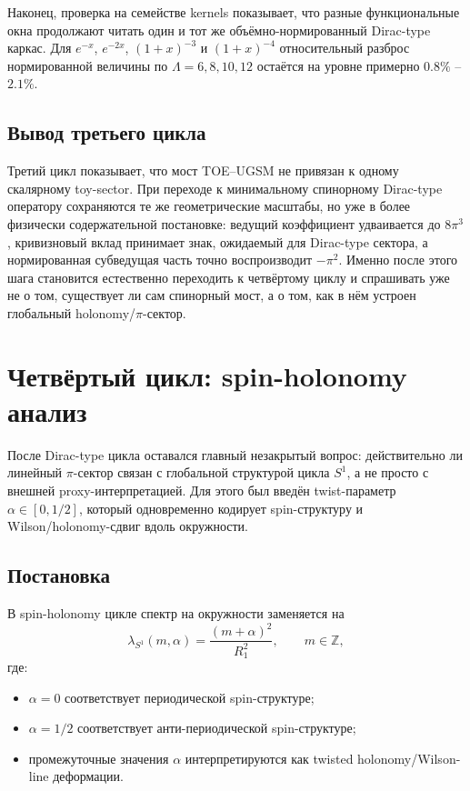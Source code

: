 \documentclass[12pt,a4paper]{article}
\begin{document}
Наконец, проверка на семействе kernels показывает, что разные функциональные окна продолжают читать один и тот же объёмно-нормированный Dirac-type каркас. Для \(e^{-x}\), \(e^{-2x}\), \((1+x)^{-3}\) и \((1+x)^{-4}\) относительный разброс нормированной величины по \(\Lambda=6,8,10,12\) остаётся на уровне примерно \(0.8\%\) -- \(2.1\%\).

\subsection{Вывод третьего цикла}

Третий цикл показывает, что мост TOE--UGSM не привязан к одному скалярному toy-sector. При переходе к минимальному спинорному Dirac-type оператору сохраняются те же геометрические масштабы, но уже в более физически содержательной постановке: ведущий коэффициент удваивается до \(8\pi^3\), кривизновый вклад принимает знак, ожидаемый для Dirac-type сектора, а нормированная субведущая часть точно воспроизводит \(-\pi^2\). Именно после этого шага становится естественно переходить к четвёртому циклу и спрашивать уже не о том, существует ли сам спинорный мост, а о том, как в нём устроен глобальный holonomy/\(\pi\)-сектор.


\section{Четвёртый цикл: spin-holonomy анализ}

После Dirac-type цикла оставался главный незакрытый вопрос: действительно ли линейный \(\pi\)-сектор связан с глобальной структурой цикла \(S^1\), а не просто с внешней proxy-интерпретацией. Для этого был введён twist-параметр \(\alpha\in[0,1/2]\), который одновременно кодирует spin-структуру и Wilson/holonomy-сдвиг вдоль окружности.

\subsection{Постановка}

В spin-holonomy цикле спектр на окружности заменяется на
\[
\lambda_{S^1}(m,\alpha)=\frac{(m+\alpha)^2}{R_1^2},
\qquad m\in\mathbb{Z},
\]
где:
\begin{itemize}
    \item \(\alpha=0\) соответствует периодической spin-структуре;
    \item \(\alpha=1/2\) соответствует анти-периодической spin-структуре;
    \item промежуточные значения \(\alpha\) интерпретируются как twisted holonomy/Wilson-line деформации.
\end{itemize}
\end{document}
